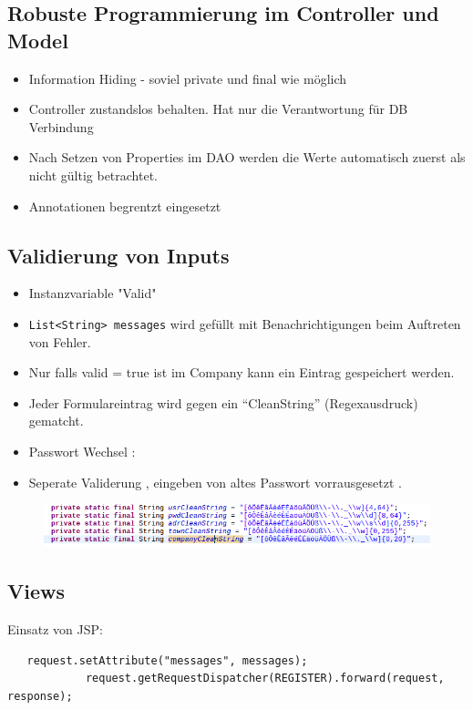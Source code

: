 \documentclass{beamer}
\begin{document}
\begin{frame}
 \section{Robuste Programmierung im Controller und Model}
 \begin{itemize}
 \item Information Hiding - soviel private und final wie möglich
 \item Controller zustandslos behalten. Hat nur die Verantwortung für DB Verbindung
 \item Nach Setzen von Properties im DAO werden die Werte automatisch zuerst als nicht gültig betrachtet.
  \item Annotationen begrentzt eingesetzt
 \end{itemize}
\end{frame}
\begin{frame}[fragile]
 \section*{Validierung von Inputs}
 \begin{itemize}
  \item Instanzvariable "Valid"
  \item \texttt{List<String> messages} wird gefüllt mit Benachrichtigungen beim Auftreten von Fehler.
  \item Nur falls valid = true ist im Company kann ein Eintrag gespeichert werden.
  \item Jeder Formulareintrag wird gegen ein ``CleanString'' (Regexausdruck) gematcht.
  \item Passwort Wechsel :
  \item Seperate Validerung , eingeben von altes Passwort vorrausgesetzt .
 \end{itemize}
\begin{figure}[h]
 \centering
 \includegraphics[scale=0.4]{./code.png}
\end{figure}


\end{frame}

\begin{frame}[fragile]

\section{Views}
Einsatz von JSP:\\
\begin{lstlisting}
   request.setAttribute("messages", messages);
			request.getRequestDispatcher(REGISTER).forward(request, response);
\end{lstlisting}
\end{frame}
  
\end{document}
